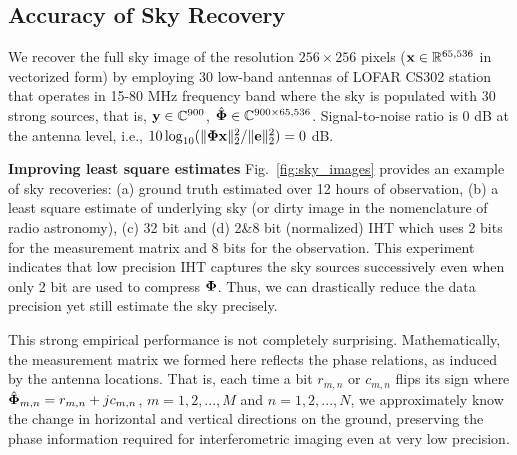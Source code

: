 \documentclass{article}
\begin{document}
{%
\subsection{Accuracy of Sky Recovery}

We recover the full sky image of the resolution $256\times 256$ pixels (${\bf x} \in \mathbb{R}^{65,536}$ in vectorized form) by employing 30 low-band antennas of LOFAR CS302 station that operates in 15-80 MHz frequency band where the sky is populated with 30 strong sources, that is, ${\bf y} \in \mathbb{C}^{900}$, $\hat{\bf \Phi} \in \mathbb{C}^{900\times 65,536}$. Signal-to-noise ratio is 0 dB at the antenna level, i.e., $10\log_{10}(\|{\bf \Phi x}\|_2^2/\|{\bf e}\|_2^2) = 0$ dB. 

{\bf Improving least square estimates}
Fig.~\ref{fig:sky_images} provides an example of sky recoveries: (a) ground truth estimated over 12 hours of observation, (b) a least square estimate of underlying sky (or dirty image in the nomenclature of radio astronomy), (c) 32 bit and (d) 2\&8 bit (normalized) IHT which uses 2 bits for the measurement matrix and 8 bits for the observation. This experiment indicates that low precision IHT captures the sky sources successively even when only 2 bit are used to compress ${\bf \Phi}$. Thus, we can drastically reduce the data precision yet still estimate the sky precisely.

This strong empirical performance is not completely surprising. Mathematically, the measurement matrix we formed here reflects the phase relations, as induced by the antenna locations.  That is, each time a bit $r_{m, n}$ or $c_{m, n}$ flips its sign where $\hat{\bf \Phi}_{m, n} = r_{m, n} +j c_{m,n}$, $m = {1, 2, ..., M}$ and $n = {1, 2, ..., N}$, we approximately know the change in horizontal and vertical directions on the ground, preserving the phase information required for interferometric imaging even at very low precision.


}
\end{document}
